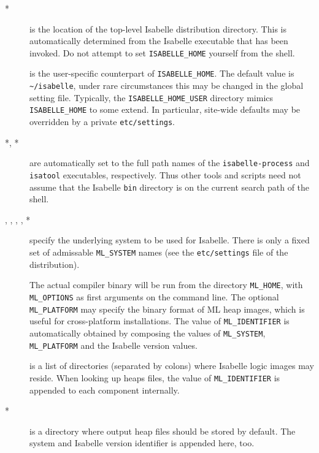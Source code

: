 \begin{description}
\item[*] is the location of the top-level Isabelle
  distribution directory. This is automatically determined from the Isabelle
  executable that has been invoked.  Do not attempt to set
  \texttt{ISABELLE_HOME} yourself from the shell.
  
\item[] is the user-specific counterpart of
  \texttt{ISABELLE_HOME}. The default value is \texttt{\~\relax/isabelle},
  under rare circumstances this may be changed in the global setting file.
  Typically, the \texttt{ISABELLE_HOME_USER} directory mimics
  \texttt{ISABELLE_HOME} to some extend. In particular, site-wide defaults may
  be overridden by a private \texttt{etc/settings}.
  
\item[*, *] are automatically set to the full
  path names of the \texttt{isabelle-process} and \texttt{isatool}
  executables, respectively.  Thus other tools and scripts need not assume
  that the Isabelle \texttt{bin} directory is on the current search path of
  the shell.
  
\item[, , ,
  , *] specify the underlying {\ML}
  system to be used for Isabelle.  There is only a fixed set of admissable
  \texttt{ML_SYSTEM} names (see the \texttt{etc/settings} file of the
  distribution).
  
  The actual compiler binary will be run from the directory \texttt{ML_HOME},
  with \texttt{ML_OPTIONS} as first arguments on the command line.  The
  optional \texttt{ML_PLATFORM} may specify the binary format of ML heap
  images, which is useful for cross-platform installations.  The value of
  \texttt{ML_IDENTIFIER} is automatically obtained by composing the values of
  \texttt{ML_SYSTEM}, \texttt{ML_PLATFORM} and the Isabelle version values.
  
\item[] is a list of directories (separated by colons)
  where Isabelle logic images may reside.  When looking up heaps files, the
  value of \texttt{ML_IDENTIFIER} is appended to each component internally.
  
\item[*] is a directory where output heap files should
  be stored by default. The {\ML} system and Isabelle version identifier is
  appended here, too.
  

\end{description}
